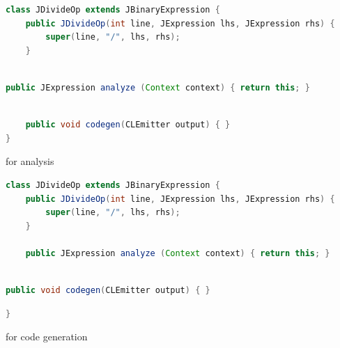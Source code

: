\documentclass[8pt,a4paper,compress]{beamer}
\begin{document}
\begin{frame}[fragile]
\begin{overprint}
\begin{tcolorbox}[enhanced,drop shadow southwest,sharp corners,size=fbox,colback=white,fontlower=\small\ttfamily,collower=silver900]

\begin{lstlisting}[language=Java,style=focusin]
class JDivideOp extends JBinaryExpression {
    public JDivideOp(int line, JExpression lhs, JExpression rhs) {
        super(line, "/", lhs, rhs);
    }
 
\end{lstlisting}
\begin{lstlisting}[language=Java,style=focusin,backgroundcolor=\color{lime100}]
    public JExpression analyze (Context context) { return this; }
\end{lstlisting}
\begin{lstlisting}[language=Java,style=focusin]
    
    public void codegen(CLEmitter output) { }
}
\end{lstlisting}

\tcblower
\begin{minipage}[t][.25cm][t]{\textwidth}
for analysis
\end{minipage}
\end{tcolorbox}

\begin{tcolorbox}[enhanced,drop shadow southwest,sharp corners,size=fbox,colback=white,fontlower=\small\ttfamily,collower=silver900]

\begin{lstlisting}[language=Java,style=focusin]
class JDivideOp extends JBinaryExpression {
    public JDivideOp(int line, JExpression lhs, JExpression rhs) {
        super(line, "/", lhs, rhs);
    }
 
    public JExpression analyze (Context context) { return this; }
    
\end{lstlisting}
\begin{lstlisting}[language=Java,style=focusin,backgroundcolor=\color{lime100}]
    public void codegen(CLEmitter output) { }
\end{lstlisting}
\begin{lstlisting}[language=Java,style=focusin]
}
\end{lstlisting}

\tcblower
\begin{minipage}[t][.25cm][t]{\textwidth}
for code generation
\end{minipage}
\end{tcolorbox}
\end{overprint}
\end{frame}
\end{document}
